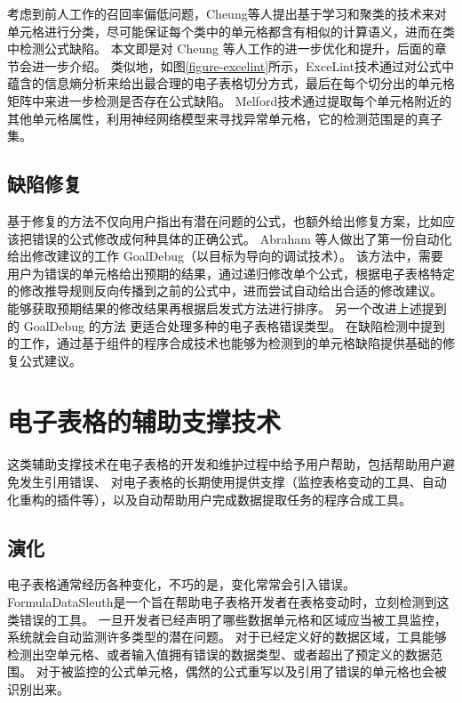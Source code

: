 
考虑到前人工作的召回率偏低问题，Cheung等人\cite{cheung2016custodes}提出基于学习和聚类的技术来对单元格进行分类，尽可能保证每个类中的单元格都含有相似的计算语义，进而在类中检测公式缺陷。
本文即是对 Cheung 等人工作的进一步优化和提升，后面的章节会进一步介绍。
类似地，如图\ref{figure-excelint}所示，ExceLint\cite{Barowy2018excelint}技术通过对公式中蕴含的信息熵分析来给出最合理的电子表格切分方式，最后在每个切分出的单元格矩阵中来进一步检测是否存在公式缺陷。
Melford\cite{singh2017melford}技术通过提取每个单元格附近的其他单元格属性，利用神经网络模型来寻找异常单元格，它的检测范围是\cu \cite{cheung2016custodes}的真子集。

\subsection{缺陷修复}
基于修复的方法不仅向用户指出有潜在问题的公式，也额外给出修复方案，比如应该把错误的公式修改成何种具体的正确公式。
Abraham 等人\cite{abraham2005goal}做出了第一份自动化给出修改建议的工作 GoalDebug（以目标为导向的调试技术）。
该方法中，需要用户为错误的单元格给出预期的结果，通过递归修改单个公式，根据电子表格特定的修改推导规则反向传播到之前的公式中，进而尝试自动给出合适的修改建议。
能够获取预期结果的修改结果再根据启发式方法进行排序。
另一个改进上述提到的 GoalDebug 的方法 \cite{abraham2007goaldebug,abraham2008mutation} 更适合处理多种的电子表格错误类型。
在缺陷检测中提到的工作\ca \cite{dou2014spreadsheet,dou2017cacheck}，通过基于组件的程序合成技术\cite{jha2010oracle}也能够为检测到的单元格缺陷提供基础的修复公式建议。


\section{电子表格的辅助支撑技术}
这类辅助支撑技术在电子表格的开发和维护过程中给予用户帮助，包括帮助用户避免发生引用错误、
对电子表格的长期使用提供支撑（监控表格变动的工具、自动化重构的插件等），以及自动帮助用户完成数据提取任务的程序合成工具。

\subsection{演化}
电子表格通常经历各种变化，不巧的是，变化常常会引入错误。
FormulaDataSleuth\cite{bekenn2008reducing}是一个旨在帮助电子表格开发者在表格变动时，立刻检测到这类错误的工具。
一旦开发者已经声明了哪些数据单元格和区域应当被工具监控，系统就会自动监测许多类型的潜在问题。
对于已经定义好的数据区域，工具能够检测出空单元格、或者输入值拥有错误的数据类型、或者超出了预定义的数据范围。
对于被监控的公式单元格，偶然的公式重写以及引用了错误的单元格也会被识别出来。

